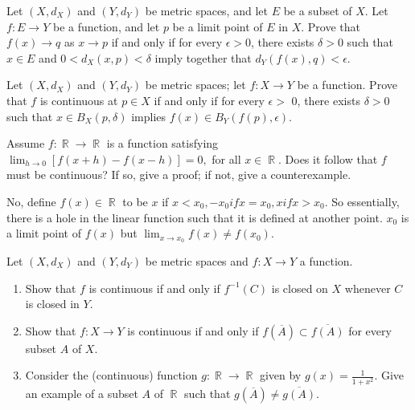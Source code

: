 \documentclass[12pt,letterpaper,boxed]{hmcpset}
\DeclareMathOperator{\R}{\mathbb{R}}
\begin{document}

\begin{problem}[Exercise 1.2]
Let $(X, d_X)$ and $(Y, d_Y)$ be metric spaces, and let $E$ be a subset of $X$. Let $f : E \rightarrow Y$ be a function, and let $p$ be a limit point of $E$ in $X$. Prove that $f(x) \rightarrow q$ as $x\rightarrow p$ if and only if for every $\epsilon > 0$, there exists $\delta > 0$ such that $x \in E$ and $0 < d_X(x,p) < \delta$ imply together that $d_Y(f(x), q) < \epsilon.$
\end{problem}

\begin{solution}

\end{solution}

\begin{problem}[Exercise 2.2]
Let $(X, d_X)$ and $(Y, d_Y)$ be metric spaces; let $f : X \rightarrow Y$ be a function. Prove that $f$ is continuous at $p\in X$ if and only if for every $\epsilon >$  0, there exists $\delta > 0$ such that $x \in B_X(p,\delta)$ implies $f(x)\in B_Y(f(p), \epsilon)$.
\end{problem}

\begin{solution}

\end{solution}

\begin{problem}[Exercise 2.9]
Assume $f: \R \rightarrow \R$ is a function satisfying $\lim_{h\rightarrow 0} [f(x + h) - f(x - h)] = 0,$ for all $x \in \R$. Does it follow that $f$ must be continuous? If so, give a proof; if not, give a counterexample.
\end{problem}

\begin{solution}
No, define $f(x) \in \R$ to be $x$ if $x < x_0, -x_0 if x = x_0, x if x > x_0$. So essentially, there is a hole in the linear function such that it is defined at another point. $x_0$ is a limit point of $f(x)$ but $\lim_{x \rightarrow x_0} f(x) \neq f(x_0).$
\end{solution}

\begin{problem}[Exercise 2.10]
Let $(X, d_X)$ and $(Y, d_Y)$ be metric spaces and $f: X \rightarrow Y$ a function. 
\vspace{-2mm}
    \begin{enumerate}
        \itemsep0em
        \item Show that $f$ is continuous if and only if $f^{-1}(C)$ is closed on $X$ whenever $C$ is closed in $Y$.
        \item Show that $f: X \rightarrow Y$ is continuous if and only if $f(\overline{A})\subset\overline{f(A)}$ for every subset $A$ of $X$.
        \item Consider the (continuous) function $g: \R \rightarrow \R$ given by $g(x) = \frac{1}{1 + x^{2}}.$ Give an example of a subset $A$ of $\R$ such that $g(\overline{A})\neq\overline{g(A)}.$
    \end{enumerate}
\end{problem}
\end{document}
